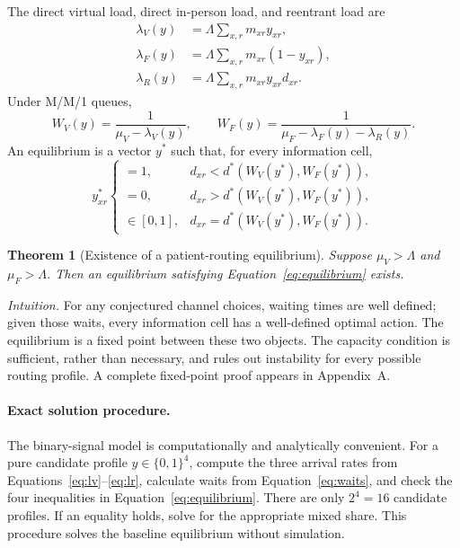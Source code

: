 \documentclass[11pt]{article}
\newtheorem{theorem}{Theorem}
\begin{document}
The direct virtual load, direct in-person load, and reentrant load are
\begin{align}
 \lambda_V(y)&=\Lambda\sum_{x,r}m_{xr}y_{xr}, \label{eq:lv}\\
 \lambda_F(y)&=\Lambda\sum_{x,r}m_{xr}(1-y_{xr}), \label{eq:lf}\\
 \lambda_R(y)&=\Lambda\sum_{x,r}m_{xr}y_{xr}d_{xr}. \label{eq:lr}
\end{align}
Under M/M/1 queues,
\begin{equation}
 W_V(y)=\frac{1}{\mu_V-\lambda_V(y)},
 \qquad
 W_F(y)=\frac{1}{\mu_F-\lambda_F(y)-\lambda_R(y)}.
 \label{eq:waits}
\end{equation}
An equilibrium is a vector $y^*$ such that, for every information cell,
\begin{equation}
 y^*_{xr}\begin{cases}
 =1,&d_{xr}<d^*(W_V(y^*),W_F(y^*)),\\
 =0,&d_{xr}>d^*(W_V(y^*),W_F(y^*)),\\
 \in[0,1],&d_{xr}=d^*(W_V(y^*),W_F(y^*)).
 \end{cases}
 \label{eq:equilibrium}
\end{equation}

\begin{theorem}[Existence of a patient-routing equilibrium]
Suppose $\mu_V>\Lambda$ and $\mu_F>\Lambda$.  Then an equilibrium satisfying Equation~\eqref{eq:equilibrium} exists.
\end{theorem}

\noindent\emph{Intuition.}  For any conjectured channel choices, waiting times are well defined; given those waits, every information cell has a well-defined optimal action.  The equilibrium is a fixed point between these two objects.  The capacity condition is sufficient, rather than necessary, and rules out instability for every possible routing profile.  A complete fixed-point proof appears in Appendix~A.

\paragraph{Exact solution procedure.}
The binary-signal model is computationally and analytically convenient.  For a pure candidate profile $y\in\{0,1\}^4$, compute the three arrival rates from Equations~\eqref{eq:lv}--\eqref{eq:lr}, calculate waits from Equation~\eqref{eq:waits}, and check the four inequalities in Equation~\eqref{eq:equilibrium}.  There are only $2^4=16$ candidate profiles.  If an equality holds, solve for the appropriate mixed share.  This procedure solves the baseline equilibrium without simulation.
\end{document}
